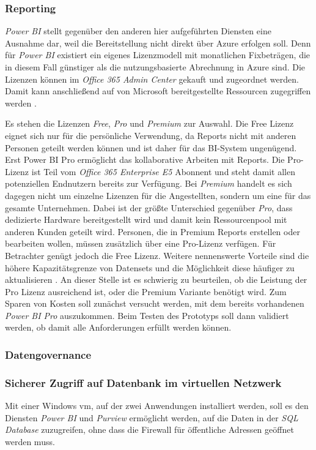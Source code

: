 \subsubsection{Reporting} \label{subsec:infra:konfig:powerbi}
\textit{Power BI} stellt gegenüber den anderen hier aufgeführten Diensten eine Ausnahme dar, weil die Bereitstellung nicht direkt über Azure erfolgen soll. Denn für  \textit{Power BI} existiert ein eigenes Lizenzmodell mit monatlichen Fixbeträgen, die in diesem Fall günstiger als die nutzungsbasierte Abrechnung in Azure sind. Die Lizenzen können im \textit{Office 365 Admin Center} gekauft und zugeordnet werden. Damit kann anschließend auf von Microsoft bereitgestellte Ressourcen zugegriffen werden \cite[vgl.][]{gunnarsson_pro_2020}.

Es stehen die Lizenzen \textit{Free}, \textit{Pro} und \textit{Premium} zur Auswahl. Die Free Lizenz eignet sich nur für die persönliche Verwendung, da Reports nicht mit anderen Personen geteilt werden können und ist daher für das BI-System ungenügend. Erst Power BI Pro ermöglicht das kollaborative Arbeiten mit Reports. Die Pro-Lizenz ist Teil vom \textit{Office 365 Enterprise E5} Abonnent und steht damit allen potenziellen Endnutzern bereits zur Verfügung. Bei \textit{Premium} handelt es sich dagegen nicht um einzelne Lizenzen für die Angestellten, sondern um eine für das gesamte Unternehmen. Dabei ist der größte Unterschied gegenüber \textit{Pro}, dass dedizierte Hardware bereitgestellt wird und damit kein Ressourcenpool mit anderen Kunden geteilt wird. Personen, die in Premium Reports erstellen oder bearbeiten wollen, müssen zusätzlich über eine Pro-Lizenz verfügen. Für Betrachter genügt jedoch die Free Lizenz. Weitere nennenswerte Vorteile sind die höhere Kapazitätsgrenze von Datensets und die Möglichkeit diese häufiger zu aktualisieren \cite[vgl.][]{gunnarsson_pro_2020}. An dieser Stelle ist es schwierig zu beurteilen, ob die Leistung der Pro Lizenz ausreichend ist, oder die Premium Variante benötigt wird. Zum Sparen von Kosten soll zunächst versucht werden, mit dem bereits vorhandenen \textit{Power BI Pro} auszukommen. Beim Testen des Prototyps soll dann validiert werden, ob damit alle Anforderungen erfüllt werden können.

\subsubsection{Datengovernance} \label{subsec:infra:konfig:purview}

\subsubsection{Sicherer Zugriff auf Datenbank im virtuellen Netzwerk} \label{subsec:infra:konfig:vm}
Mit einer Windows \ac{vm}, auf der zwei Anwendungen installiert werden, soll es den Diensten \textit{Power BI} und \textit{Purview} ermöglicht werden, auf die Daten in der \textit{SQL Database} zuzugreifen, ohne dass die Firewall für öffentliche Adressen geöffnet werden muss. 

